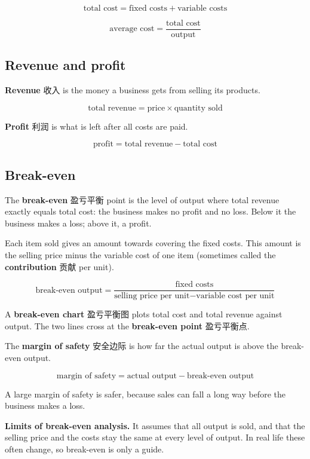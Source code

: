 \documentclass[11pt]{article}
\begin{document}
\[
\text{total cost} = \text{fixed costs} + \text{variable costs}
\]

\[
\text{average cost} = \frac{\text{total cost}}{\text{output}}
\]

\subsection*{Revenue and profit}

\textbf{Revenue} 收入 is the money a business gets from selling its products.

\[
\text{total revenue} = \text{price} \times \text{quantity sold}
\]

\textbf{Profit} 利润 is what is left after all costs are paid.

\[
\text{profit} = \text{total revenue} - \text{total cost}
\]

\subsection*{Break-even}

The \textbf{break-even} 盈亏平衡 point is the level of output where total revenue exactly equals total cost: the business makes no profit and no loss. Below it the business makes a loss; above it, a profit.

Each item sold gives an amount towards covering the fixed costs. This amount is the selling price minus the variable cost of one item (sometimes called the \textbf{contribution} 贡献 per unit).

\[
\text{break-even output} = \frac{\text{fixed costs}}{\text{selling price per unit} - \text{variable cost per unit}}
\]

A \textbf{break-even chart} 盈亏平衡图 plots total cost and total revenue against output. The two lines cross at the \textbf{break-even point} 盈亏平衡点.

The \textbf{margin of safety} 安全边际 is how far the actual output is above the break-even output.

\[
\text{margin of safety} = \text{actual output} - \text{break-even output}
\]

A large margin of safety is safer, because sales can fall a long way before the business makes a loss.

\textbf{Limits of break-even analysis.} It assumes that all output is sold, and that the selling price and the costs stay the same at every level of output. In real life these often change, so break-even is only a guide.
\end{document}
